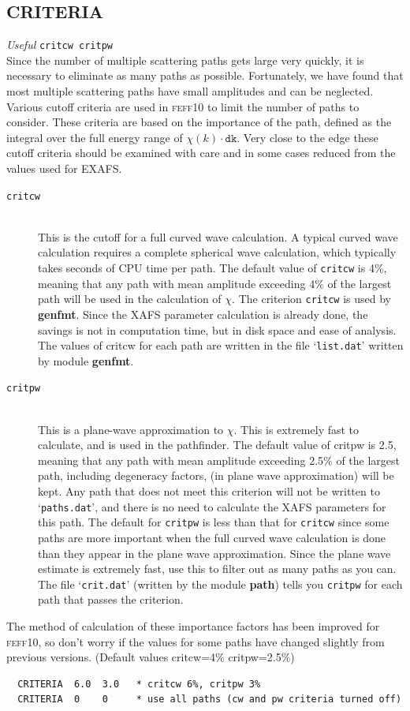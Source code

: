 \documentclass[11pt,oneside]{report} %
\newcommand{\program}[1]{\textsc{#1}}
\newcommand{\feff}{\program{feff}}
\newcommand{\vnum}{10}
\newcommand{\feffcur}{\feff\vnum}
\newenvironment{Card}[4]%
      {\vspace{3ex}%
        \subsection{#1}
        \quad\textsl{#3}\newline
        \quad\texttt{#2}\newline%
        \label{card:#4}\\}
      {}
\newcommand{\file}[1]{`\texttt{#1}'}
\newcommand{\module}[1]{\textrm{\bf{#1}}}
\begin{document}
\begin{Card}{CRITERIA}{critcw critpw}{Useful}{cri}
  Since the number of multiple scattering paths gets large very
  quickly, it is necessary to eliminate as many paths as possible.
  Fortunately, we have found that most multiple scattering paths have
  small amplitudes and can be neglected. Various cutoff criteria
  are used in {\feffcur} to limit the number of paths to consider. These
  criteria are based on the importance of the path, defined as the
  integral over the full energy range of $\chi(k)\cdot\mathtt{dk}$.
  Very close to the edge these cutoff criteria should be examined
  with care and in some cases reduced from the values used for EXAFS.
 \begin{description}
  \item[\texttt{critcw}]\hfill\\ 
  This is the cutoff for a full curved wave calculation. A
  typical curved wave calculation requires a complete spherical wave
  calculation, which typically takes seconds of CPU time per path.
  The default value of \texttt{critcw} is 4\%, meaning that any path
  with mean amplitude exceeding 4\% of the largest path will be used in
  the calculation of $\chi$. The criterion \texttt{critcw} is used by 
  \module{genfmt}.
  Since the XAFS parameter calculation is already done, the savings is
  not in computation time, but in disk space and ease of analysis. The
  values of critcw for each path are written in the file \file{list.dat}
  written by module \module{genfmt}.

  \item[\texttt{critpw}]\hfill\\ 
  This is a plane-wave approximation to $\chi$. This is
  extremely fast to calculate, and is used in the pathfinder. The
  default value of critpw is 2.5, meaning that any path with mean
  amplitude exceeding 2.5\% of the largest path, including degeneracy 
  factors, (in plane wave approximation) will be kept. Any path that does 
  not meet this criterion will not be written to \file{paths.dat}, and 
  there is no need to calculate the XAFS parameters for this path. The
  default for \texttt{critpw} is less than that for \texttt{critcw}
  since some paths are more important when the full curved wave
  calculation is done than they appear in the plane wave
  approximation. Since the plane wave estimate is extremely fast, use
  this to filter out as many paths as you can. The file
  \file{crit.dat} (written by the module \module{path}) tells you
  \texttt{critpw} for each path that passes the criterion.
 \end{description}
  The method of calculation of these importance factors has been
  improved for {\feffcur}, so don't worry if the values for
  some paths have changed slightly from previous versions. (Default
  values critcw=4\% critpw=2.5\%)

\begin{verbatim}
  CRITERIA  6.0  3.0   * critcw 6%, critpw 3%
  CRITERIA  0    0     * use all paths (cw and pw criteria turned off)
\end{verbatim}
\end{Card}
\end{document}
